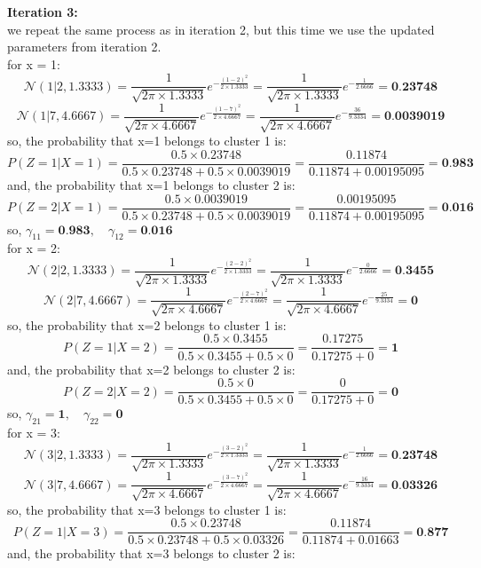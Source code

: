 \documentclass{article}
\begin{document}
\begin{enumerate}
\textbf{Iteration 3:}
\\ we repeat the same process as in iteration 2, but this time we use the updated parameters from iteration 2.
\\ for x = 1:
\[
\mathcal{N}(1 | 2, 1.3333) = \frac{1}{\sqrt{2\pi \times 1.3333}} e^{-\frac{(1-2)^2}{2 \times 1.3333}} = \frac{1}{\sqrt{2\pi \times 1.3333}} e^{-\frac{1}{2.6666}} = \textbf{0.23748}
\]
\[
\mathcal{N}(1 | 7, 4.6667) = \frac{1}{\sqrt{2\pi \times 4.6667}} e^{-\frac{(1-7)^2}{2 \times 4.6667}} = \frac{1}{\sqrt{2\pi \times 4.6667}} e^{-\frac{36}{9.3334}} = \textbf{0.0039019}
\]
so, the probability that x=1 belongs to cluster 1 is:
\[
P(Z = 1 | X = 1) = \frac{0.5 \times 0.23748}{0.5 \times 0.23748 + 0.5 \times 0.0039019} = \frac{0.11874}{0.11874 + 0.00195095} = \textbf{0.983}
\]
and, the probability that x=1 belongs to cluster 2 is:
\[
P(Z = 2 | X = 1) = \frac{0.5 \times 0.0039019}{0.5 \times 0.23748 + 0.5 \times 0.0039019} = \frac{0.00195095}{0.11874 + 0.00195095} = \textbf{0.016}
\]
so, $\gamma_{11} = \textbf{0.983}, \quad \gamma_{12} = \textbf{0.016}$
\\ for x = 2:
\[
\mathcal{N}(2 | 2, 1.3333) = \frac{1}{\sqrt{2\pi \times 1.3333}} e^{-\frac{(2-2)^2}{2 \times 1.3333}} = \frac{1}{\sqrt{2\pi \times 1.3333}} e^{-\frac{0}{2.6666}} = \textbf{0.3455}
\]
\[
\mathcal{N}(2 | 7, 4.6667) = \frac{1}{\sqrt{2\pi \times 4.6667}} e^{-\frac{(2-7)^2}{2 \times 4.6667}} = \frac{1}{\sqrt{2\pi \times 4.6667}} e^{-\frac{25}{9.3334}} = \textbf{0}
\]
so, the probability that x=2 belongs to cluster 1 is:
\[
P(Z = 1 | X = 2) = \frac{0.5 \times 0.3455}{0.5 \times 0.3455 + 0.5 \times 0} = \frac{0.17275}{0.17275 + 0} = \textbf{1}
\]
and, the probability that x=2 belongs to cluster 2 is:
\[
P(Z = 2 | X = 2) = \frac{0.5 \times 0}{0.5 \times 0.3455 + 0.5 \times 0} = \frac{0}{0.17275 + 0} = \textbf{0}
\]
so, $\gamma_{21} = \textbf{1}, \quad \gamma_{22} = \textbf{0}$
\\ for x = 3:
\[
\mathcal{N}(3 | 2, 1.3333) = \frac{1}{\sqrt{2\pi \times 1.3333}} e^{-\frac{(3-2)^2}{2 \times 1.3333}} = \frac{1}{\sqrt{2\pi \times 1.3333}} e^{-\frac{1}{2.6666}} = \textbf{0.23748}
\]
\[
\mathcal{N}(3 | 7, 4.6667) = \frac{1}{\sqrt{2\pi \times 4.6667}} e^{-\frac{(3-7)^2}{2 \times 4.6667}} = \frac{1}{\sqrt{2\pi \times 4.6667}} e^{-\frac{16}{9.3334}} = \textbf{0.03326}
\]
so, the probability that x=3 belongs to cluster 1 is:
\[
P(Z = 1 | X = 3) = \frac{0.5 \times 0.23748}{0.5 \times 0.23748 + 0.5 \times 0.03326} = \frac{0.11874}{0.11874 + 0.01663} = \textbf{0.877}
\]
and, the probability that x=3 belongs to cluster 2 is:

\end{enumerate}
\end{document}
